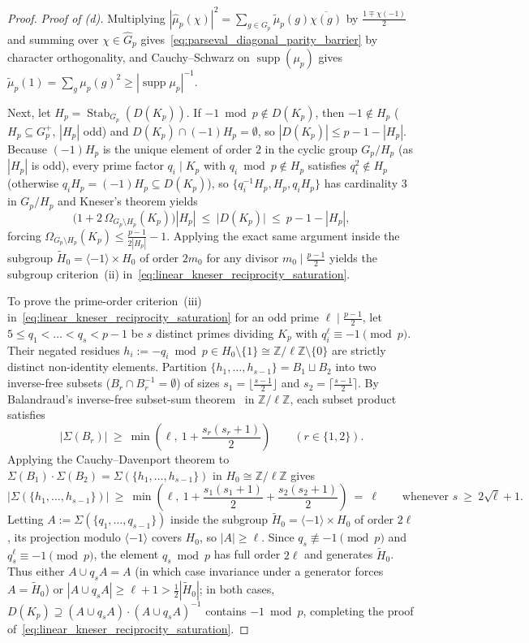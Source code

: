 \documentclass[11pt, a4paper]{article}
\theoremstyle{plain}
\theoremstyle{definition}
\newcommand{\Z}{\mathbb{Z}}
\begin{document}
\begin{proof}
\medskip\noindent\emph{Proof of (d).} Multiplying $|\widehat{\mu}_p(\chi)|^{2}=\sum_{g\in G_p}\widetilde{\mu}_p(g)\overline{\chi(g)}$ by $\frac{1\mp\chi(-1)}{2}$ and summing over $\chi\in\widehat{G}_p$ gives~\eqref{eq:parseval_diagonal_parity_barrier} by character orthogonality, and Cauchy--Schwarz on $\operatorname{supp}(\mu_p)$ gives $\widetilde{\mu}_p(1)=\sum_g\mu_p(g)^{2}\ge|\operatorname{supp}\mu_p|^{-1}$.

Next, let $H_p=\operatorname{Stab}_{G_p}(D(K_p))$. If $-1\bmod p\notin D(K_p)$, then $-1\notin H_p$ ($H_p\subseteq G_p^{+}$, $|H_p|$ odd) and $D(K_p)\cap(-1)H_p=\emptyset$, so $|D(K_p)|\le p-1-|H_p|$. Because $(-1)H_p$ is the unique element of order $2$ in the cyclic group $G_p/H_p$ (as $|H_p|$ is odd), every prime factor $q_i\mid K_p$ with $q_i\bmod p\notin H_p$ satisfies $q_i^{2}\notin H_p$ (otherwise $q_i H_p=(-1)H_p\subseteq D(K_p)$), so $\{q_i^{-1}H_p,H_p,q_i H_p\}$ has cardinality $3$ in $G_p/H_p$ and Kneser's theorem yields
\[
\big(1+2\,\Omega_{G_p\setminus H_p}(K_p)\big)|H_p|\ \le\ \big|D(K_p)\big|\ \le\ p-1-|H_p|,
\]
forcing $\Omega_{G_p\setminus H_p}(K_p)\le\frac{p-1}{2|H_p|}-1$. Applying the exact same argument inside the subgroup $\widetilde{H}_0=\langle -1\rangle\times H_0$ of order $2m_0$ for any divisor $m_0\mid\frac{p-1}{2}$ yields the subgroup criterion~(ii) in~\eqref{eq:linear_kneser_reciprocity_saturation}.

To prove the prime-order criterion~(iii) in~\eqref{eq:linear_kneser_reciprocity_saturation} for an odd prime $\ell\mid\frac{p-1}{2}$, let $5\le q_1<\dots<q_s<p-1$ be $s$ distinct primes dividing $K_p$ with $q_i^{\ell}\equiv-1\pmod p$. Their negated residues $h_i:=-q_i\bmod p\in H_0\setminus\{1\}\cong\Z/\ell\Z\setminus\{0\}$ are strictly distinct non-identity elements. Partition $\{h_1,\dots,h_{s-1}\}=B_1\sqcup B_2$ into two inverse-free subsets ($B_r\cap B_r^{-1}=\emptyset$) of sizes $s_1=\lfloor\frac{s-1}{2}\rfloor$ and $s_2=\lceil\frac{s-1}{2}\rceil$. By Balandraud's inverse-free subset-sum theorem~\cite{balandraud2012} in $\Z/\ell\Z$, each subset product satisfies
\[
\big|\Sigma(B_r)\big|\ \ge\ \min\!\left(\ell,\ 1+\frac{s_r(s_r+1)}{2}\right)\qquad (r\in\{1,2\}).
\]
Applying the Cauchy--Davenport theorem to $\Sigma(B_1)\cdot\Sigma(B_2)=\Sigma(\{h_1,\dots,h_{s-1}\})$ in $H_0\cong\Z/\ell\Z$ gives
\[
\big|\Sigma(\{h_1,\dots,h_{s-1}\})\big|\ \ge\ \min\!\left(\ell,\ 1+\frac{s_1(s_1+1)}{2}+\frac{s_2(s_2+1)}{2}\right)\ =\ \ell\qquad\text{whenever } s\ \ge\ 2\sqrt{\ell}+1.
\]
Letting $A:=\Sigma(\{q_1,\dots,q_{s-1}\})$ inside the subgroup $\widetilde{H}_0=\langle -1\rangle\times H_0$ of order $2\ell$, its projection modulo $\langle -1\rangle$ covers $H_0$, so $|A|\ge\ell$. Since $q_s\not\equiv-1\pmod p$ and $q_s^{\ell}\equiv-1\pmod p$, the element $q_s\bmod p$ has full order $2\ell$ and generates $\widetilde{H}_0$. Thus either $A\cup q_s A=A$ (in which case invariance under a generator forces $A=\widetilde{H}_0$) or $|A\cup q_s A|\ge\ell+1>\frac12|\widetilde{H}_0|$; in both cases, $D(K_p)\supseteq(A\cup q_s A)\cdot(A\cup q_s A)^{-1}$ contains $-1\bmod p$, completing the proof of~\eqref{eq:linear_kneser_reciprocity_saturation}.


\end{proof}
\end{document}
